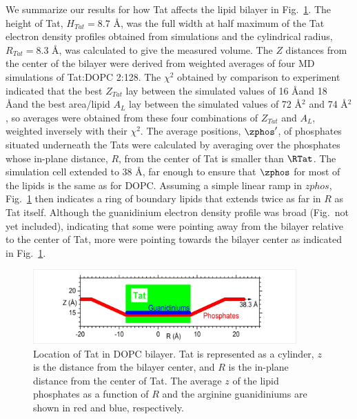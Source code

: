 We summarize our results for how Tat affects the lipid bilayer in Fig.~\ref{fig:figure9}. 
The height of Tat, $H_{Tat} = 8.7$ \AA, was the full width at half maximum of 
the Tat electron density profiles
obtained from simulations and the cylindrical radius, $R_{Tat} = 8.3$ \AA, was 
calculated to give the
measured volume. The $Z$ distances from the center of the bilayer were derived 
from weighted
averages of four MD simulations of Tat:DOPC 2:128. The $\chi^2$ obtained by 
comparison to
experiment indicated that the best $Z_{Tat}$ lay between the simulated values 
of 16 \AA and 18 \AA and
the best area/lipid $A_L$ lay between the simulated values of 72 \AA$^2$ and 
74 \AA$^2$, 
so averages were
obtained from these four combinations of $Z_{Tat}$ and $A_L$, weighted inversely 
with their $\chi^2$. The
average positions, $\zphos'$, of phosphates situated underneath the Tats were calculated by
averaging over the phosphates whose in-plane distance, $R$, from the center of Tat is smaller than
$\RTat$. The simulation cell extended to 38 \AA, far enough to ensure that $\zphos$ for most of the lipids is
the same as for DOPC. Assuming a simple linear ramp in $zphos$, Fig.~\ref{fig:figure9} then indicates a ring of
boundary lipids that extends twice as far in $R$ as Tat itself. Although the guanidinium electron
density profile was broad (Fig.~not yet included), indicating that some were pointing away from the bilayer
relative to the center of Tat, more were pointing towards the bilayer center as indicated in Fig.~\ref{fig:figure9}.

\begin{figure}[htbp]
  \centering
  \includegraphics[width=0.9\textwidth]{figures/Tat/figure9}
  \caption{Location of Tat in DOPC bilayer. Tat is represented as a cylinder, $z$ is the distance
  from the bilayer center, and $R$ is the in-plane distance from the center of Tat. The average $z$ of
  the lipid phosphates as a function of $R$ and the arginine guanidiniums are shown in red and blue,
  respectively.}
  \label{fig:figure9}
\end{figure}

